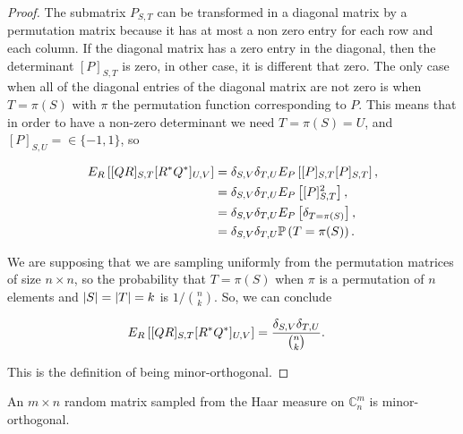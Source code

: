 \begin{proof}
    The submatrix $P_{S,T}$ can be transformed in a diagonal matrix by a permutation matrix because it has at most a non zero entry for each row and each column. If the diagonal matrix has a zero entry in the diagonal, then the determinant $[P]_{S,T}$ is zero, in other case, it is different that zero. The only case when all of the diagonal entries of the diagonal matrix are not zero is when $T = \pi(S)$ with $\pi$ the permutation function corresponding to $P$. This means that in order to have a non-zero determinant we need $T = \pi(S) = U$, and $[P]_{S,U} = \in \{-1,1\}$, so

    \begin{align*}
        E_R \left[ [QR]_{S,T}[R^*Q^*]_{U,V} \right] &= \delta_{S,V} \delta_{T,U} E_{P}\left[  [P]_{S,T}[P]_{S,T} \right],\\ 
        &= \delta_{S,V} \delta_{T,U} E_{P}\left[  [P]_{S,T}^2 \right],\\ 
        &= \delta_{S,V} \delta_{T,U} E_{P}\left[  \delta_{T=\pi(S)} \right], \\ 
        &= \delta_{S,V} \delta_{T,U} \mathbb P\left( T = \pi(S) \right).
    \end{align*}

    We are supposing that we are sampling uniformly from the permutation matrices of size $n \times n$, so the probability that $T = \pi(S)$ when $\pi$ is a permutation of $n$ elements and $\lvert S \rvert = \lvert T \rvert = k$ is $1/\binom{n}{k}$. So, we can conclude

    \begin{align*}
        E_R \left[ [QR]_{S,T}[R^*Q^*]_{U,V} \right] &= \frac{\delta_{S,V} \delta_{T,U}}{\binom{n}{k}}.
    \end{align*}

    This is the definition of being minor-orthogonal. 

\end{proof}


\begin{corollary}
    An $m\times n$ random matrix sampled from the Haar measure on $\mathbb C_{n}^m$ is minor-orthogonal.
\end{corollary}

